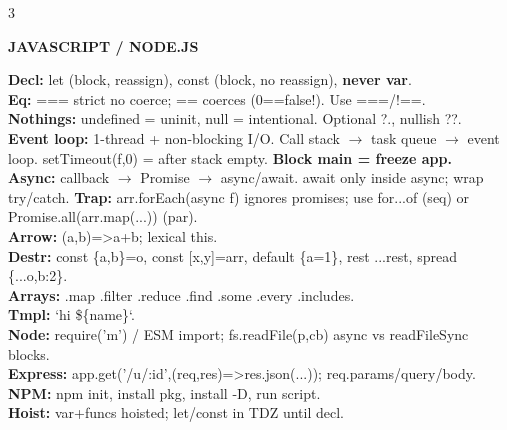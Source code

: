 \documentclass[10pt,letterpaper]{article}
\newenvironment{topic}[1]{%
  \par\addvspace{1.5pt}%
  \noindent\colorbox{hdrBG}{%
    \begin{minipage}{\dimexpr\linewidth-2\fboxsep\relax}%
      \centering\bfseries\sffamily\fontsize{6pt}{7pt}\selectfont\color{hdrFG}\MakeUppercase{#1}%
    \end{minipage}%
  }\par\nobreak\vskip0.5pt%
  \begingroup\setlength{\leftskip}{0pt}\setlength{\rightskip}{0pt}%
}{%
  \endgroup\par\addvspace{0.5pt}%
}
\newcommand{\warn}[1]{\textcolor{warnC}{\textbf{#1}}}
\newcommand{\hd}[1]{\textcolor{accent}{\textbf{#1}}}
\newcommand{\cn}[1]{{\ttfamily\small #1}}
\begin{document}
\begin{multicols*}{3}
\begin{topic}{JavaScript / Node.js}
\hd{Decl:} \cn{let} (block, reassign), \cn{const} (block, no reassign), \warn{never var}.\\
\hd{Eq:} \cn{===} strict no coerce; \cn{==} coerces (\cn{0==false}!). Use \cn{===}/\cn{!==}.\\
\hd{Nothings:} \cn{undefined} = uninit, \cn{null} = intentional. Optional \cn{?.}, nullish \cn{??}.\\
\hd{Event loop:} 1-thread + non-blocking I/O. Call stack $\to$ task queue $\to$ event loop. \cn{setTimeout(f,0)} = after stack empty. \warn{Block main = freeze app.}\\
\hd{Async:} callback $\to$ Promise $\to$ \cn{async/await}. \cn{await} only inside \cn{async}; wrap \cn{try/catch}. \warn{Trap:} \cn{arr.forEach(async f)} ignores promises; use \cn{for...of} (seq) or \cn{Promise.all(arr.map(...))} (par).\\
\hd{Arrow:} \cn{(a,b)=>a+b}; lexical \cn{this}.\\
\hd{Destr:} \cn{const \{a,b\}=o}, \cn{const [x,y]=arr}, default \cn{\{a=1\}}, rest \cn{...rest}, spread \cn{\{...o,b:2\}}.\\
\hd{Arrays:} \cn{.map .filter .reduce .find .some .every .includes}.\\
\hd{Tmpl:} \cn{`hi \$\{name\}`}.\\
\hd{Node:} \cn{require('m')} / ESM \cn{import}; \cn{fs.readFile(p,cb)} async vs \cn{readFileSync} blocks.\\
\hd{Express:} \cn{app.get('/u/:id',(req,res)=>res.json(...))}; \cn{req.params/query/body}.\\
\hd{NPM:} \cn{npm init}, \cn{install pkg}, \cn{install -D}, \cn{run script}.\\
\hd{Hoist:} \cn{var}+funcs hoisted; \cn{let/const} in TDZ until decl.
\end{topic}


\end{multicols*}
\end{document}
